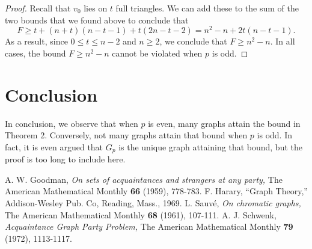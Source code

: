 \documentclass[10pt]{amsart}
\begin{document}
\begin{proof}
    Recall that $v_0$ lies on $t$ full triangles. We can add these to the sum of the two bounds that
    we found above to conclude that
    $$ F \ge t + (n + t)(n - t - 1) + t(2n - t - 2) = n^2 - n + 2t(n - t - 1). $$
    As a result, since $0 \le t \le n - 2$ and $n \ge 2$, we conclude that $F \ge n^2 - n$.
    In all cases, the bound $F \ge n^2 - n$ cannot be violated when $p$ is odd.
\end{proof}


\section{Conclusion}

In conclusion, we observe that when $p$ is even, many graphs attain the bound in Theorem 2. Conversely,
not many graphs attain that bound when $p$ is odd. In fact, it is even argued that $G_p$ is the unique 
graph attaining that bound, but the proof is too long to include here.



\begin{thebibliography}{10}

     A. W. Goodman, \emph{On sets of acquaintances and strangers at any party,} The American Mathematical Monthly {\bf 66} (1959), 778-783.
     F. Harary, ``Graph Theory,'' Addison-Wesley Pub. Co, Reading, Mass., 1969.
     L. Sauv\'e, \emph{On chromatic graphs,} The American Mathematical Monthly {\bf 68} (1961), 107-111.
     A. J. Schwenk, \emph{Acquaintance Graph Party Problem,} The American Mathematical Monthly {\bf 79} (1972), 1113-1117.

\end{thebibliography}
\end{document}
